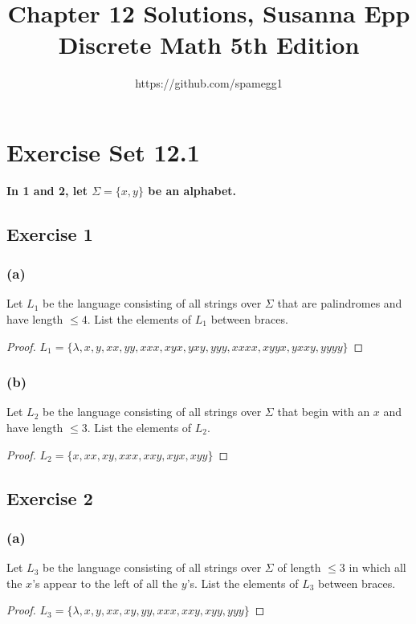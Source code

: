 \documentclass[14pt]{extarticle}
\title{Chapter 12 Solutions, Susanna Epp Discrete Math 5th Edition}
\author{https://github.com/spamegg1}
\newcommand{\cy}{\color{cyan}}
\begin{document}
\maketitle
\tableofcontents

\section{Exercise Set 12.1}

{\bf \cy In 1 and 2, let \(\Sigma = \{x, y\}\) be an alphabet.}

\subsection{Exercise 1}
\subsubsection{(a)}
Let \(L_1\) be the language consisting of all strings over \(\Sigma\) that are palindromes and have length \(\leq 4\). 
List the elements of \(L_1\) between braces.

\begin{proof}
\(L_1 = \{\lambda, x, y, xx, yy, xxx, xyx, yxy, yyy, xxxx, xyyx, yxxy, yyyy\}\)
\end{proof}

\subsubsection{(b)}
Let \(L_2\) be the language consisting of all strings over \(\Sigma\) that begin with an \(x\) and have length \(\leq 3\). 
List the elements of \(L_2\).

\begin{proof}
\(L_2 = \{x, xx, xy, xxx, xxy, xyx, xyy\}\)
\end{proof}

\subsection{Exercise 2}
\subsubsection{(a)}
Let \(L_3\) be the language consisting of all strings over \(\Sigma\) of length \(\leq 3\) in which all the \(x\)’s appear 
to the left of all the \(y\)’s. List the elements of \(L_3\) between braces.

\begin{proof}
\(L_3 = \{\lambda, x, y, xx, xy, yy, xxx, xxy, xyy, yyy\}\)
\end{proof}
\end{document}
